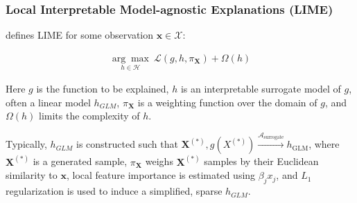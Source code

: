 \documentclass[11pt,
               aspectratio=169
               ]{beamer}
\begin{document}
		\begin{frame}
		
			\frametitle{Local Interpretable Model-agnostic Explanations (LIME)}
			
				\cite{lime} defines LIME for some observation $\mathbf{x} \in \mathcal{X}$:
			
				\begin{equation*}
					\begin{aligned}
						\underset{h \in \mathcal{H}}{\arg\max}\:\mathcal{L}(g, h, \pi_{\mathbf{X}}) + \Omega(h)
					\end{aligned}
				\end{equation*}
			
				Here $g$ is the function to be explained, $h$ is an interpretable surrogate model of $g$, often a linear model $h_{GLM}$, $\pi_{\mathbf{X}}$ is a weighting function over the domain of $g$, and $\Omega(h)$ limits the complexity of $h$.
			
				\vspace{5pt}
			
				Typically, $h_{GLM}$ is constructed such that $\mathbf{X}^{(*)}, g({X}^{(*)}) \xrightarrow{\mathcal{A}_{\text{surrogate}}} h_{\text{GLM}}$, where $\mathbf{X}^{(*)}$ is a generated sample, $\pi_{\mathbf{X}}$ weighs $\mathbf{X}^{(*)}$ samples by their Euclidean similarity to $\mathbf{x}$, local feature importance is estimated using $\beta_j x_j$, and $L_1$ regularization is used to induce a simplified, sparse $h_{GLM}$. 		
			
			
		\end{frame}
	
\end{document}

